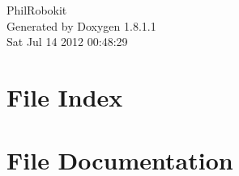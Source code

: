 \documentclass{book}
\begin{document}
\begin{titlepage}
\vspace*{7cm}
\begin{center}
{\Large Phil\-Robokit }\\
\vspace*{1cm}
{\large Generated by Doxygen 1.8.1.1}\\
\vspace*{0.5cm}
{\small Sat Jul 14 2012 00:48:29}\\
\end{center}
\end{titlepage}
\clearemptydoublepage
{}
\tableofcontents
\clearemptydoublepage
{}
\chapter{File Index}

\chapter{File Documentation}



































\printindex
\end{document}
